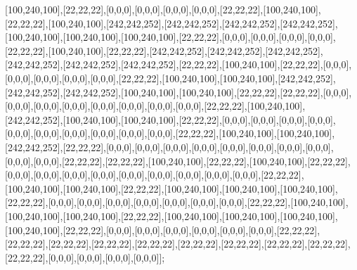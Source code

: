 [100,240,100],[22,22,22],[0,0,0],[0,0,0],[0,0,0],[0,0,0],[22,22,22],[100,240,100],[22,22,22],[100,240,100],[242,242,252],[242,242,252],[242,242,252],[242,242,252],[100,240,100],[100,240,100],[100,240,100],[22,22,22],[0,0,0],[0,0,0],[0,0,0],[0,0,0],[22,22,22],[100,240,100],[22,22,22],[242,242,252],[242,242,252],[242,242,252],[242,242,252],[242,242,252],[242,242,252],[22,22,22],[100,240,100],[22,22,22],[0,0,0],[0,0,0],[0,0,0],[0,0,0],[0,0,0],[22,22,22],[100,240,100],[100,240,100],[242,242,252],[242,242,252],[242,242,252],[100,240,100],[100,240,100],[22,22,22],[22,22,22],[0,0,0],[0,0,0],[0,0,0],[0,0,0],[0,0,0],[0,0,0],[0,0,0],[0,0,0],[22,22,22],[100,240,100],[242,242,252],[100,240,100],[100,240,100],[22,22,22],[0,0,0],[0,0,0],[0,0,0],[0,0,0],[0,0,0],[0,0,0],[0,0,0],[0,0,0],[0,0,0],[0,0,0],[22,22,22],[100,240,100],[100,240,100],[242,242,252],[22,22,22],[0,0,0],[0,0,0],[0,0,0],[0,0,0],[0,0,0],[0,0,0],[0,0,0],[0,0,0],[0,0,0],[0,0,0],[22,22,22],[22,22,22],[100,240,100],[22,22,22],[100,240,100],[22,22,22],[0,0,0],[0,0,0],[0,0,0],[0,0,0],[0,0,0],[0,0,0],[0,0,0],[0,0,0],[0,0,0],[22,22,22],[100,240,100],[100,240,100],[22,22,22],[100,240,100],[100,240,100],[100,240,100],[22,22,22],[0,0,0],[0,0,0],[0,0,0],[0,0,0],[0,0,0],[0,0,0],[0,0,0],[22,22,22],[100,240,100],[100,240,100],[100,240,100],[22,22,22],[100,240,100],[100,240,100],[100,240,100],[100,240,100],[22,22,22],[0,0,0],[0,0,0],[0,0,0],[0,0,0],[0,0,0],[0,0,0],[22,22,22],[22,22,22],[22,22,22],[22,22,22],[22,22,22],[22,22,22],[22,22,22],[22,22,22],[22,22,22],[22,22,22],[0,0,0],[0,0,0],[0,0,0],[0,0,0]];

